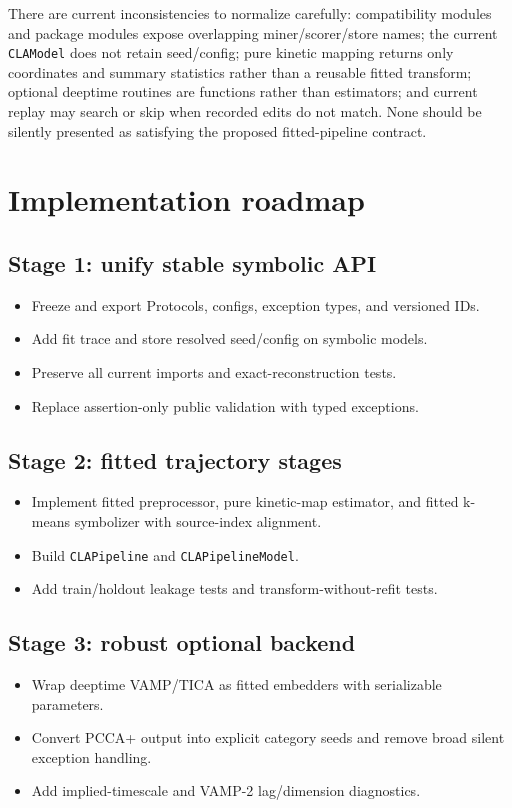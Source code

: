\documentclass[11pt]{article}
\begin{document}
There are current inconsistencies to normalize carefully: compatibility modules
and package modules expose overlapping miner/scorer/store names; the current
\texttt{CLAModel} does not retain seed/config; pure kinetic mapping returns only
coordinates and summary statistics rather than a reusable fitted transform;
optional deeptime routines are functions rather than estimators; and current
replay may search or skip when recorded edits do not match. None should be
silently presented as satisfying the proposed fitted-pipeline contract.

\section{Implementation roadmap}

\subsection*{Stage 1: unify stable symbolic API}
\begin{itemize}[nosep]
\item Freeze and export Protocols, configs, exception types, and versioned IDs.
\item Add fit trace and store resolved seed/config on symbolic models.
\item Preserve all current imports and exact-reconstruction tests.
\item Replace assertion-only public validation with typed exceptions.
\end{itemize}

\subsection*{Stage 2: fitted trajectory stages}
\begin{itemize}[nosep]
\item Implement fitted preprocessor, pure kinetic-map estimator, and fitted
  k-means symbolizer with source-index alignment.
\item Build \texttt{CLAPipeline} and \texttt{CLAPipelineModel}.
\item Add train/holdout leakage tests and transform-without-refit tests.
\end{itemize}

\subsection*{Stage 3: robust optional backend}
\begin{itemize}[nosep]
\item Wrap deeptime VAMP/TICA as fitted embedders with serializable parameters.
\item Convert PCCA+ output into explicit category seeds and remove broad silent
  exception handling.
\item Add implied-timescale and VAMP-2 lag/dimension diagnostics.
\end{itemize}
\end{document}
